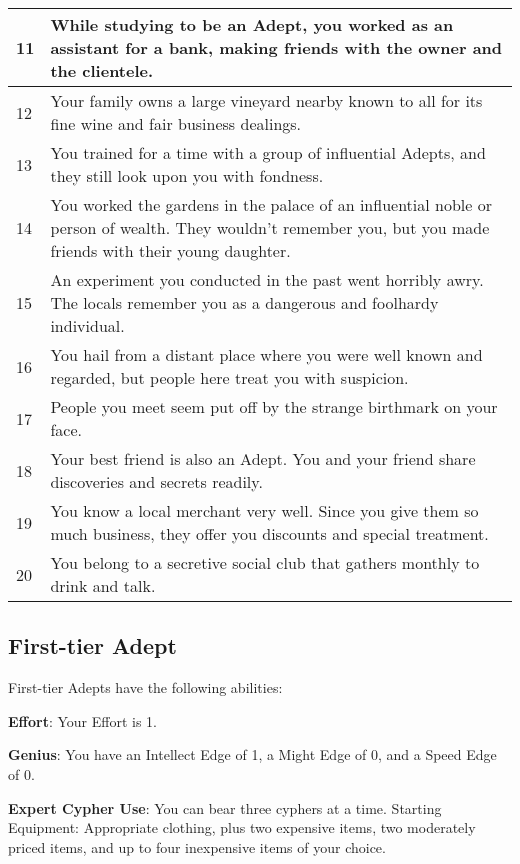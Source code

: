 \begin{multicols}{2}
\begin{table*}
\begin{tabularx}{\textwidth}{| p{} | p{} |}
11 & While studying to be an Adept, you worked as an assistant for a bank, making friends with the owner and the clientele. \\ \hline
12 & Your family owns a large vineyard nearby known to all for its fine wine and fair business dealings. \\ \hline
13 & You trained for a time with a group of influential Adepts, and they still look upon you with fondness. \\ \hline
14 & You worked the gardens in the palace of an influential noble or person of wealth. They wouldn’t remember you, but you made friends with their young daughter. \\ \hline
15 & An experiment you conducted in the past went horribly awry. The locals remember you as a dangerous and foolhardy individual. \\ \hline
16 & You hail from a distant place where you were well known and regarded, but people here treat you with suspicion. \\ \hline
17 & People you meet seem put off by the strange birthmark on your face. \\ \hline
18 & Your best friend is also an Adept. You and your friend share discoveries and secrets readily. \\ \hline
19 & You know a local merchant very well. Since you give them so much business, they offer you discounts and special treatment. \\ \hline
20 & You belong to a secretive social club that gathers monthly to drink and talk. \\ \hline

\end{tabularx}

\end{table*}

\subsection{First-tier Adept}

First-tier Adepts have the following abilities:

\textbf{Effort}: Your Effort is 1. 

\textbf{Genius}: You have an Intellect Edge of 1, a Might Edge of 0, and a Speed Edge of 0. 

\textbf{Expert Cypher Use}: You can bear three cyphers at a time. 
Starting Equipment: Appropriate clothing, plus two expensive items, two moderately priced items, and up to four inexpensive items of your choice.


\end{multicols}

